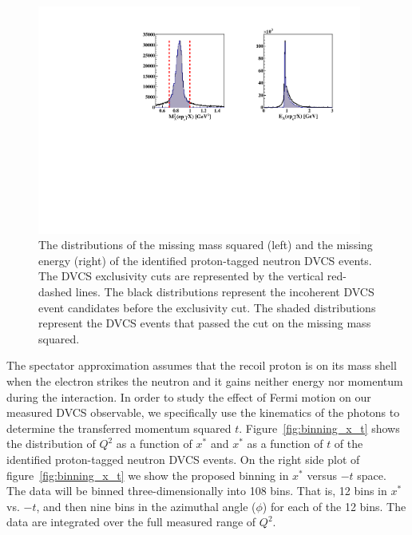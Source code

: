\begin{figure}[htb]
  \centering
    \includegraphics[width=0.95\textwidth,clip]{figs/all_inincoh_exc_cuts.pdf}
  \caption{The distributions of the missing mass squared (left) and the missing 
   energy (right) of the identified proton-tagged neutron DVCS events. The DVCS 
   exclusivity cuts are represented by the vertical red-dashed lines. The black 
   distributions represent the incoherent DVCS event candidates before the 
   exclusivity cut. The shaded distributions represent the DVCS events that 
   passed the cut on the missing mass squared.
   \label{fig:tagged_exclusive}}
\end{figure}

The spectator approximation assumes that the recoil proton is on its mass shell 
when the electron strikes the neutron and it gains neither energy nor momentum 
during the interaction. In order to study the effect of Fermi motion on our 
measured DVCS observable, we specifically use the kinematics of the photons to 
determine the transferred momentum squared $t$.  Figure~\ref{fig:binning_x_t} 
shows the distribution of $Q^2$ as a function of $x^*$ and $x^*$ as a function 
of $t$ of the identified proton-tagged neutron DVCS events. On the right side 
plot of figure~\ref{fig:binning_x_t} we show the proposed binning in $x^{*}$ 
versus $-t$ space. The data will be binned three-dimensionally into 108 bins.  
That is, 12 bins in $x^{*}$ vs. $-t$, and then nine bins in the azimuthal angle 
($\phi$) for each of the 12 bins. The data are integrated over the full 
measured range of $Q^2$.   
   

